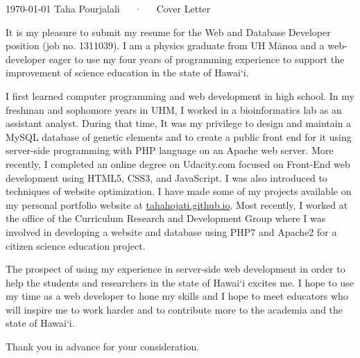 \documentclass[11pt, a4paper]{awesome-cv}
\begin{document}
\makecvheader

\makecvfooter
  {\today}
  {Taha Pourjalali~~~·~~~Cover Letter}
  {}

\makelettertitle

\begin{cvletter}

It is my pleasure to submit my resume for the Web and Database Developer position (job no. 1311039). I am a physics graduate from UH Mānoa and a web-developer eager to use my four years of programming experience to support the improvement of science education in the state of Hawai‘i.

I first learned computer programming and web development in high school. In my freshman and sophomore years in UHM, I worked in a bioinformatics lab as an assistant analyst. During that time, It was my privilege to design and maintain a MySQL database of genetic elements and to create a public front end for it using server-side programming with PHP language on an Apache web server. More recently, I completed an online degree on Udacity.com focused on Front-End web development using HTML5, CSS3, and JavaScript. I was also introduced to techniques of website optimization. I have made some of my projects available on my personal portfolio website at \href{http://tahahojati.github.io}{tahahojati.github.io}.  Most recently, I worked at the office of the Curriculum Research and Development Group where I  was involved in developing a website and database using PHP7 and Apache2 for a citizen science education project. 

The prospect of using my experience in server-side web development in order to help the students and researchers in the state of Hawai‘i excites me. I hope to use my time as a web developer to hone my skills %
and I hope to meet educators who will inspire me to work harder and to contribute more to the academia and the state of Hawai‘i.

Thank you in advance for your consideration.

\end{cvletter}


\makeletterclosing
\end{document}

